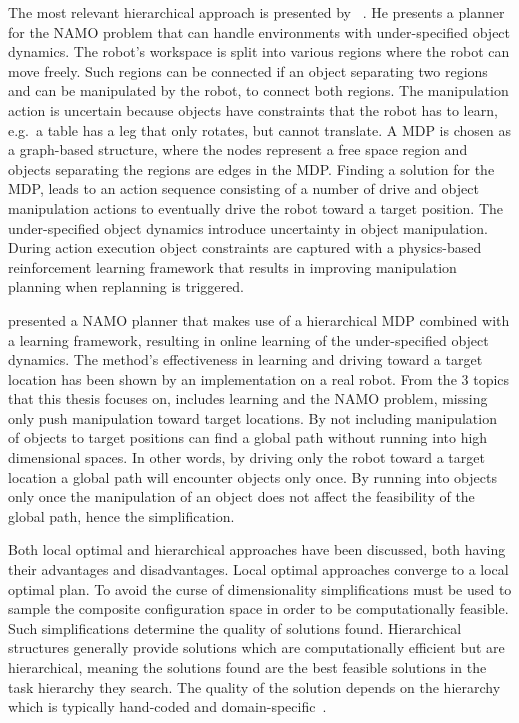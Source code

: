The most relevant hierarchical approach is presented by \citeauthor{scholz_navigation_2016}~\cite{scholz_navigation_2016}. He presents a planner for the \ac{NAMO} problem that can handle environments with under-specified object dynamics. The robot's workspace is split into various regions where the robot can move freely. Such regions can be connected if an object separating two regions and can be manipulated by the robot, to connect both regions. The manipulation action is uncertain because objects have constraints that the robot has to learn, e.g.~a table has a leg that only rotates, but cannot translate. A \ac{MDP} is chosen as a graph-based structure, where the nodes represent a free space region and objects separating the regions are edges in the \ac{MDP}. Finding a solution for the \ac{MDP}, leads to an action sequence consisting of a number of drive and object manipulation actions to eventually drive the robot toward a target position. The under-specified object dynamics introduce uncertainty in object manipulation. During action execution object constraints are captured with a physics-based reinforcement learning framework that results in improving manipulation planning when replanning is triggered.\bs

\citeauthor{scholz_navigation_2016} presented a \ac{NAMO} planner that makes use of a hierarchical \ac{MDP} combined with a learning framework, resulting in online learning of the under-specified object dynamics. The method's effectiveness in learning and driving toward a target location has been shown by an implementation on a real robot. From the 3 topics that this thesis focuses on, \citeauthor{scholz_navigation_2016} includes learning and the \ac{NAMO} problem, missing only push manipulation toward target locations. By not including manipulation of objects to target positions \citeauthor{scholz_navigation_2016} can find a global path without running into high dimensional spaces. In other words, by driving only the robot toward a target location a global path will encounter objects only once. By running into objects only once the manipulation of an object does not affect the feasibility of the global path, hence the simplification.\bs
{}

Both local optimal and hierarchical approaches have been discussed, both having their advantages and disadvantages. Local optimal approaches converge to a local optimal plan. To avoid the curse of dimensionality simplifications must be used to sample the composite configuration space in order to be computationally feasible. Such simplifications determine the quality of solutions found. Hierarchical structures generally provide solutions which are computationally efficient but are hierarchical, meaning the solutions found are the best feasible solutions in the task hierarchy they search. The quality of the solution depends on the hierarchy which is typically hand-coded and domain-specific~\cite{vega-brown_asymptotically_2020}.\bs

